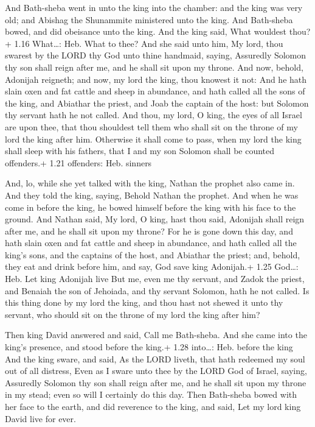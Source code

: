  And Bath-sheba went in unto the king into the chamber:
and the king was very old; and Abishag the Shunammite ministered unto
the king.  And Bath-sheba bowed, and did obeisance unto the
king. And the king said, What wouldest thou?+ 1.16 What\ldots: Heb. What
to thee?  And she said unto him, My lord, thou swarest by
the LORD thy God unto thine handmaid, saying, Assuredly Solomon thy son
shall reign after me, and he shall sit upon my throne.  And
now, behold, Adonijah reigneth; and now, my lord the king, thou knowest
it not:  And he hath slain oxen and fat cattle and sheep in
abundance, and hath called all the sons of the king, and Abiathar the
priest, and Joab the captain of the host: but Solomon thy servant hath
he not called.  And thou, my lord, O king, the eyes of all
Israel are upon thee, that thou shouldest tell them who shall sit on the
throne of my lord the king after him.  Otherwise it shall
come to pass, when my lord the king shall sleep with his fathers, that I
and my son Solomon shall be counted offenders.+ 1.21 offenders: Heb.
sinners

 And, lo, while she yet talked with the king, Nathan the
prophet also came in.  And they told the king, saying,
Behold Nathan the prophet. And when he was come in before the king, he
bowed himself before the king with his face to the ground. 
And Nathan said, My lord, O king, hast thou said, Adonijah shall reign
after me, and he shall sit upon my throne?  For he is gone
down this day, and hath slain oxen and fat cattle and sheep in
abundance, and hath called all the king's sons, and the captains of the
host, and Abiathar the priest; and, behold, they eat and drink before
him, and say, God save king Adonijah.+ 1.25 God\ldots: Heb. Let king
Adonijah live  But me, even me thy servant, and Zadok the
priest, and Benaiah the son of Jehoiada, and thy servant Solomon, hath
he not called.  Is this thing done by my lord the king, and
thou hast not shewed it unto thy servant, who should sit on the throne
of my lord the king after him?

 Then king David answered and said, Call me Bath-sheba.
And she came into the king's presence, and stood before the king.+ 1.28
into\ldots: Heb. before the king  And the king sware, and
said, As the LORD liveth, that hath redeemed my soul out of all
distress,  Even as I sware unto thee by the LORD God of
Israel, saying, Assuredly Solomon thy son shall reign after me, and he
shall sit upon my throne in my stead; even so will I certainly do this
day.  Then Bath-sheba bowed with her face to the earth, and
did reverence to the king, and said, Let my lord king David live for
ever.


